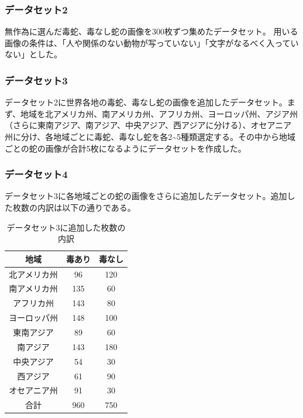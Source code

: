 \documentclass[a4paper, 11pt, titlepage]{jsarticle}
\begin{document}
\subsubsection{データセット2}
無作為に選んだ毒蛇、毒なし蛇の画像を300枚ずつ集めたデータセット。
用いる画像の条件は、「人や関係のない動物が写っていない」「文字がなるべく入っていない」とした。\par

\subsubsection{データセット3}
データセット2に世界各地の毒蛇、毒なし蛇の画像を追加したデータセット。まず、地域を北アメリカ州、南アメリカ州、アフリカ州、ヨーロッパ州、アジア州（さらに東南アジア、南アジア、中央アジア、西アジアに分ける）、オセアニア州に分け、各地域ごとに毒蛇、毒なし蛇を各2\textasciitilde5種類選定する。その中から地域ごとの蛇の画像が合計5枚になるようにデータセットを作成した。\par

\subsubsection{データセット4}
データセット3に各地域ごとの蛇の画像をさらに追加したデータセット。追加した枚数の内訳は以下の通りである。\par
\begin{table}[htb]
\centering
  \caption{データセット3に追加した枚数の内訳}
  \begin{tabular}{|c|c|c|}  \hline
    地域 & 毒あり & 毒なし \\ \hline \hline
    北アメリカ州 & 96 & 120 \\ \hline
    南アメリカ州 & 135 & 60 \\ \hline
    アフリカ州 & 143 & 80 \\ \hline
    ヨーロッパ州 & 148 & 100 \\ \hline
    東南アジア & 89 & 60 \\ \hline
    南アジア & 143 & 180 \\ \hline
    中央アジア & 54 & 30 \\ \hline
    西アジア & 61 & 90 \\ \hline
    オセアニア州 & 91 & 30 \\ \hline \hline
    合計 & 960 & 750 \\ \hline
  \end{tabular}
\end{table}
\end{document}
